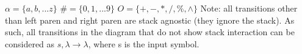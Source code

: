 \documentclass{article}
\begin{document}
    $\alpha=\{a,b,...z\}$ \newline
    $\#=\{0,1,...9\}$ \newline
    $O=\{+,-,*,/,\%,\wedge\}$ \newline
    Note: all transitions other than left paren and right paren are stack agnostic (they ignore the stack). As such, all transitions in the diagram that do not show stack interaction can be considered as $s, \lambda \rightarrow \lambda$, where s is the input symbol.
    
\end{document}

